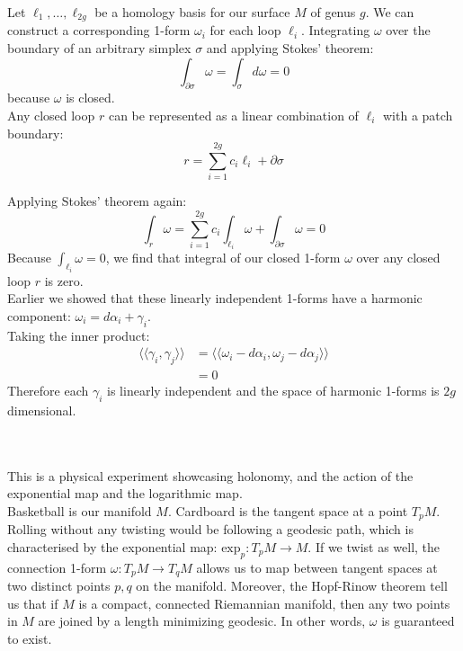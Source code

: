 \documentclass{article}
\def\ll{\langle\langle}
\def\rr{\rangle\rangle}
\begin{document}
Let $\ell_1, \dots , \ell_{2g}$ be a homology basis for our surface $M$ of genus $g$.
We can construct a corresponding 1-form $\omega_i$ for each loop $\ell_i$. Integrating $\omega$ over the boundary of 
an arbitrary simplex $\sigma$ and applying Stokes' theorem:
$$
    \int_{\partial\sigma} \omega = \int_\sigma d\omega = 0
$$
because $\omega$ is closed. \\

Any closed loop $r$ can be represented as a linear combination of $\ell_i$ with a patch boundary:
$$
    r = \sum_{i=1}^{2g} c_i \ell_i + \partial\sigma
$$

Applying Stokes' theorem again:
$$
    \int_r \omega = \sum_{i=1}^{2g} c_i \int_{\ell_i} \omega + \int_{\partial\sigma} \omega = 0
$$
Because $\int_{\ell_i} \omega = 0$, we find that integral of our closed 1-form $\omega$ over any closed loop $r$ is zero. \\

Earlier we showed that these linearly independent 1-forms have a harmonic component: $\omega_i = d\alpha_i + \gamma_i$. \\
Taking the inner product:
\begin{align*}
    \ll \gamma_i, \gamma_j \rr &= \ll \omega_i - d\alpha_i, \omega_j - d\alpha_j \rr \\
        &= 0
\end{align*}
Therefore each $\gamma_i$ is linearly independent and the space of harmonic 1-forms is $2g$ dimensional.


\vspace{1.8cm}
\\\\


This is a physical experiment showcasing holonomy, and the action of the exponential map and the logarithmic map.\\

Basketball is our manifold $M$. Cardboard is the tangent space at a point $T_pM$.
Rolling without any twisting would be following a geodesic path, which is characterised by the exponential map:
$\text{exp}_p: T_pM \to M$.
If we twist as well, the connection 1-form $\omega: T_pM \to T_qM$ allows us to map between tangent spaces
at two distinct points $p, q$ on the manifold. Moreover, the Hopf-Rinow theorem tell us that if $M$ is a compact, 
connected Riemannian manifold, then any two points in $M$ are joined by a length minimizing geodesic. In other words,
$\omega$ is guaranteed to exist. \\
\end{document}
